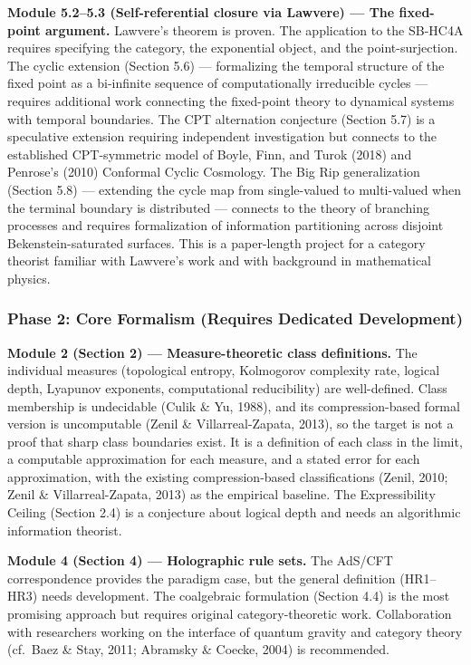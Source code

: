 \documentclass[
]{article}
\begin{document}
\textbf{Module 5.2--5.3 (Self-referential closure via Lawvere) --- The
fixed-point argument.} Lawvere's theorem is proven. The application to
the SB-HC4A requires specifying the category, the exponential object,
and the point-surjection. The cyclic extension (Section 5.6) ---
formalizing the temporal structure of the fixed point as a bi-infinite
sequence of computationally irreducible cycles --- requires additional
work connecting the fixed-point theory to dynamical systems with
temporal boundaries. The CPT alternation conjecture (Section 5.7) is a
speculative extension requiring independent investigation but connects
to the established CPT-symmetric model of Boyle, Finn, and Turok (2018)
and Penrose's (2010) Conformal Cyclic Cosmology. The Big Rip
generalization (Section 5.8) --- extending the cycle map from
single-valued to multi-valued when the terminal boundary is distributed
--- connects to the theory of branching processes and requires
formalization of information partitioning across disjoint
Bekenstein-saturated surfaces. This is a paper-length project for a
category theorist familiar with Lawvere's work and with background in
mathematical physics.

\hypertarget{phase-2-core-formalism-requires-dedicated-development}{%
\subsubsection{Phase 2: Core Formalism (Requires Dedicated
Development)}\label{phase-2-core-formalism-requires-dedicated-development}}

\textbf{Module 2 (Section 2) --- Measure-theoretic class definitions.}
The individual measures (topological entropy, Kolmogorov complexity
rate, logical depth, Lyapunov exponents, computational reducibility) are
well-defined. Class membership is undecidable (Culik \& Yu, 1988), and
its compression-based formal version is uncomputable (Zenil \&
Villarreal-Zapata, 2013), so the target is not a proof that sharp class
boundaries exist. It is a definition of each class in the limit, a
computable approximation for each measure, and a stated error for each
approximation, with the existing compression-based classifications
(Zenil, 2010; Zenil \& Villarreal-Zapata, 2013) as the empirical
baseline. The Expressibility Ceiling (Section 2.4) is a conjecture about
logical depth and needs an algorithmic information theorist.

\textbf{Module 4 (Section 4) --- Holographic rule sets.} The AdS/CFT
correspondence provides the paradigm case, but the general definition
(HR1--HR3) needs development. The coalgebraic formulation (Section 4.4)
is the most promising approach but requires original category-theoretic
work. Collaboration with researchers working on the interface of quantum
gravity and category theory (cf.~Baez \& Stay, 2011; Abramsky \& Coecke,
2004) is recommended.
\end{document}
